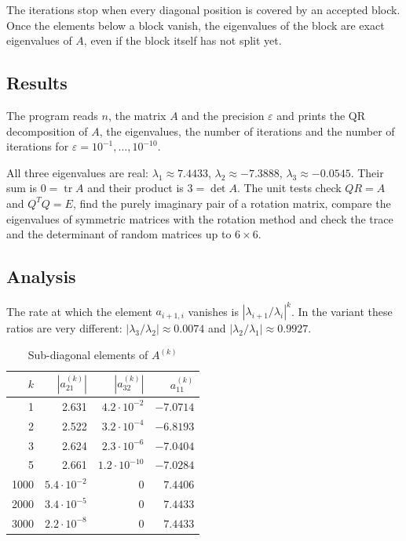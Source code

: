 The iterations stop when every diagonal position is covered by an accepted block. Once the
elements below a block vanish, the eigenvalues of the block are exact eigenvalues of $A$, even if
the block itself has not split yet.

\subsection{Results}

The program reads $n$, the matrix $A$ and the precision $\varepsilon$ and prints the QR
decomposition of $A$, the eigenvalues, the number of iterations and the number of iterations for
$\varepsilon = 10^{-1}, \ldots, 10^{-10}$.




All three eigenvalues are real: $\lambda_1 \approx 7.4433$, $\lambda_2 \approx -7.3888$,
$\lambda_3 \approx -0.0545$. Their sum is $0 = \operatorname{tr} A$ and their product is
$3 = \det A$. The unit tests check $QR = A$ and $Q^T Q = E$, find the purely imaginary pair of a
rotation matrix, compare the eigenvalues of symmetric matrices with the rotation method and check
the trace and the determinant of random matrices up to $6 \times 6$.

\subsection{Analysis}

The rate at which the element $a_{i+1,i}$ vanishes is $|\lambda_{i+1} / \lambda_i|^k$. In the
variant these ratios are very different:
$|\lambda_3 / \lambda_2| \approx 0.0074$ and $|\lambda_2 / \lambda_1| \approx 0.9927$.

\begin{table}[!ht]
\centering
\begin{tabular}{|r|r|r|r|}
\hline
\rowcolor{lightgray}
$k$ & $|a_{21}^{(k)}|$ & $|a_{32}^{(k)}|$ & $a_{11}^{(k)}$ \\
\hline
1 & 2.631 & $4.2 \cdot 10^{-2}$ & $-7.0714$ \\
\hline
2 & 2.522 & $3.2 \cdot 10^{-4}$ & $-6.8193$ \\
\hline
3 & 2.624 & $2.3 \cdot 10^{-6}$ & $-7.0404$ \\
\hline
5 & 2.661 & $1.2 \cdot 10^{-10}$ & $-7.0284$ \\
\hline
1000 & $5.4 \cdot 10^{-2}$ & 0 & $7.4406$ \\
\hline
2000 & $3.4 \cdot 10^{-5}$ & 0 & $7.4433$ \\
\hline
3000 & $2.2 \cdot 10^{-8}$ & 0 & $7.4433$ \\
\hline
\end{tabular}
\caption{Sub-diagonal elements of $A^{(k)}$}
\end{table}

